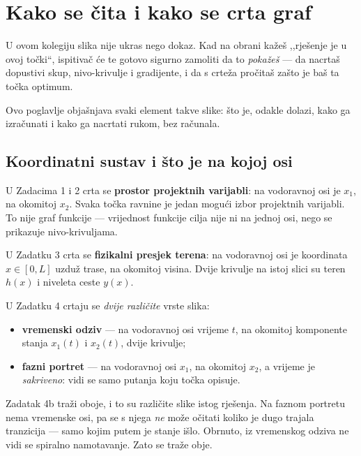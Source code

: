 \chapter{Kako se čita i kako se crta graf}
\label{ch:graf}

U ovom kolegiju slika nije ukras nego dokaz. Kad na obrani kažeš ,,rješenje je u
ovoj točki``, ispitivač će te gotovo sigurno zamoliti da to \emph{pokažeš} --- da
nacrtaš dopustivi skup, nivo-krivulje i gradijente, i da s crteža pročitaš zašto
je baš ta točka optimum.

Ovo poglavlje objašnjava svaki element takve slike: što je, odakle dolazi, kako
ga izračunati i kako ga nacrtati rukom, bez računala.

\section{Koordinatni sustav i što je na kojoj osi}
\label{sec:koordinatni-sustav}

U Zadacima 1 i 2 crta se \textbf{prostor projektnih varijabli}: na vodoravnoj
osi je $x_1$, na okomitoj $x_2$. Svaka točka ravnine je jedan mogući izbor
projektnih varijabli. To nije graf funkcije --- vrijednost funkcije cilja nije
ni na jednoj osi, nego se prikazuje nivo-krivuljama.

U Zadatku 3 crta se \textbf{fizikalni presjek terena}: na vodoravnoj osi je
koordinata $x \in [0, L]$ uzduž trase, na okomitoj visina. Dvije krivulje na
istoj slici su teren $h(x)$ i niveleta ceste $y(x)$.

U Zadatku 4 crtaju se \emph{dvije različite} vrste slika:
\begin{itemize}[nosep,leftmargin=*]
  \item \textbf{vremenski odziv} --- na vodoravnoj osi vrijeme $t$, na okomitoj
        komponente stanja $x_1(t)$ i $x_2(t)$, dvije krivulje;
  \item \textbf{fazni portret} --- na vodoravnoj osi $x_1$, na okomitoj $x_2$,
        a vrijeme je \emph{sakriveno}: vidi se samo putanja koju točka opisuje.
\end{itemize}

\begin{zamka}
Zadatak 4b traži oboje, i to su različite slike istog rješenja. Na faznom
portretu nema vremenske osi, pa se s njega \emph{ne} može očitati koliko je
dugo trajala tranzicija --- samo kojim putem je stanje išlo. Obrnuto, iz
vremenskog odziva ne vidi se spiralno namotavanje. Zato se traže obje.
\end{zamka}


